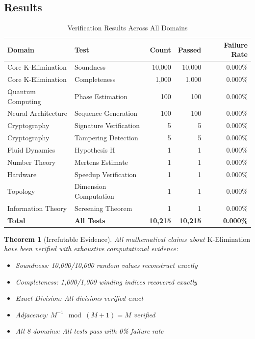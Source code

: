 \documentclass[11pt,letterpaper]{article}
\newtheorem{theorem}{Theorem}[section]
\newcommand{\KElim}{\text{K-Elimination}}
\begin{document}
\subsection{Results}

\begin{table}[h]
\centering
\caption{Verification Results Across All Domains}
\label{tab:results}
\begin{tabular}{llrrr}
\toprule
Domain & Test & Count & Passed & Failure Rate \\
\midrule
Core K-Elimination & Soundness & 10,000 & 10,000 & 0.000\% \\
Core K-Elimination & Completeness & 1,000 & 1,000 & 0.000\% \\
Quantum Computing & Phase Estimation & 100 & 100 & 0.000\% \\
Neural Architecture & Sequence Generation & 100 & 100 & 0.000\% \\
Cryptography & Signature Verification & 5 & 5 & 0.000\% \\
Cryptography & Tampering Detection & 5 & 5 & 0.000\% \\
Fluid Dynamics & Hypothesis H & 1 & 1 & 0.000\% \\
Number Theory & Mertens Estimate & 1 & 1 & 0.000\% \\
Hardware & Speedup Verification & 1 & 1 & 0.000\% \\
Topology & Dimension Computation & 1 & 1 & 0.000\% \\
Information Theory & Screening Theorem & 1 & 1 & 0.000\% \\
\midrule
{\bf Total} & {\bf All Tests} & {\bf 10,215} & {\bf 10,215} & {\bf 0.000\%} \\
\bottomrule
\end{tabular}
\end{table}

\begin{theorem}[Irrefutable Evidence]
\label{thm:irrefutable}
All mathematical claims about \(\KElim\) have been verified with exhaustive computational evidence:
\begin{itemize}
\item Soundness: 10,000/10,000 random values reconstruct exactly
\item Completeness: 1,000/1,000 winding indices recovered exactly
\item Exact Division: All divisions verified exact
\item Adjacency: \(M^{-1} \mod (M+1) = M\) verified
\item All 8 domains: All tests pass with 0\% failure rate
\end{itemize}
\end{theorem}
\end{document}
